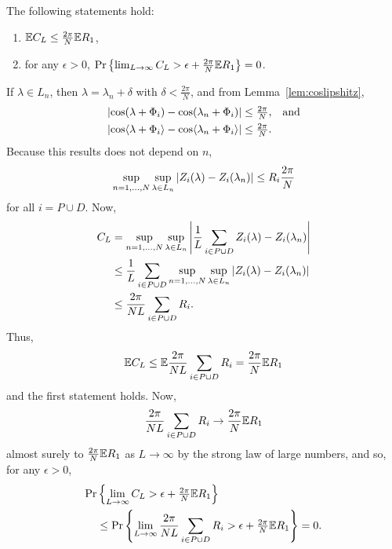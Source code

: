 \documentclass[journal]{IEEEtran}
\begin{document}
\begin{lemma}\label{lem:CL} The following statements hold:
\begin{enumerate}
\item ${\mathbb E} C_L \leq \tfrac{2\pi}{N}{\mathbb E} R_1$,
\item for any $\epsilon > 0$, ${\operatorname{Pr}}\left\{ \lim_{L \rightarrow \infty} C_L > \epsilon + \tfrac{2\pi}{N}{\mathbb E} R_1 \right\} = 0$.
\end{enumerate}
\end{lemma}
\begin{IEEEproof}
If $\lambda \in L_n$, then $\lambda = \lambda_n + \delta$ with $\delta < \tfrac{2\pi}{N}$, and from Lemma~\ref{lem:coslipshitz},
\begin{align*}
&{\left\vert \cos(\lambda + \Phi_i) - \cos(\lambda_n + \Phi_i) \right\vert} \leq \tfrac{2\pi}{N}, \;\;\; \text{and} \\
&{\left\vert \cos\langle \lambda + \Phi_i \rangle - \cos\langle \lambda_n + \Phi_i \rangle \right\vert} \leq \tfrac{2\pi}{N}.
\end{align*}
Because this results does not depend on $n$,
\[
\sup_{n=1,\dots,N}\sup_{\lambda \in L_n} {\left\vert Z_i(\lambda) - Z_i(\lambda_n) \right\vert} \leq R_i \frac{2\pi}{N}
\]
for all $i = P \cup D$.  Now,
\begin{align*}
C_L &= \sup_{n=1,\dots,N}\sup_{\lambda \in L_n}{\left\vert \frac{1}{L}\sum_{i \in P \cup D} Z_i(\lambda) - Z_i(\lambda_n) \right\vert} \\
&\leq \frac{1}{L}\sum_{i \in P \cup D} \sup_{n=1,\dots,N}\sup_{\lambda \in L_n} {\left\vert Z_i(\lambda) - Z_i(\lambda_n) \right\vert} \\
&\leq \frac{2\pi}{N L}\sum_{i \in P \cup D} R_i .
\end{align*}
Thus, 
\[
{\mathbb E} C_L \leq {\mathbb E} \frac{2\pi}{N L}\sum_{i \in P \cup D} R_i = \frac{2\pi}{N}{\mathbb E} R_1
\]
and the first statement holds.  Now, 
\[
\frac{2\pi}{N L}\sum_{i \in P \cup D} R_i \rightarrow \frac{2\pi}{N}{\mathbb E} R_1
\] 
almost surely to $\frac{2\pi}{N}{\mathbb E} R_1$ as $L \rightarrow\infty$ by the strong law of large numbers, and so, for any $\epsilon > 0$,
\begin{align*}
{\operatorname{Pr}}&\left\{ \lim_{L \rightarrow \infty} C_L > \epsilon + \tfrac{2\pi}{N}{\mathbb E} R_1 \right\} \\
&\leq {\operatorname{Pr}}\left\{ \lim_{L \rightarrow \infty} \frac{2\pi}{N L}\sum_{i \in P \cup D} R_i > \epsilon + \tfrac{2\pi}{N}{\mathbb E} R_1 \right\} = 0.
\end{align*}
\end{IEEEproof}
\end{document}
